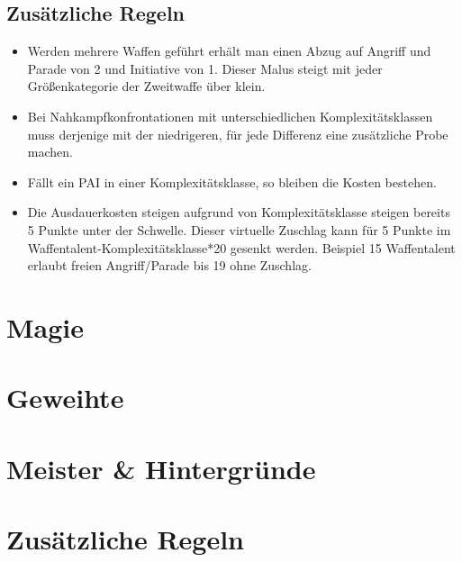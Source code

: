 \documentclass[a4paper,12pt,oneside]{book}
\begin{document}
\chapter{Zusätzliche Regeln}
\begin{itemize}
\item Werden mehrere Waffen geführt erhält man einen Abzug auf Angriff und Parade von 2 und Initiative von 1. Dieser Malus steigt mit jeder Größenkategorie der Zweitwaffe über klein.
\item Bei Nahkampfkonfrontationen mit unterschiedlichen Komplexitätsklassen muss derjenige mit der niedrigeren, für jede Differenz eine zusätzliche Probe machen.
\item Fällt ein PAI in einer Komplexitätsklasse, so bleiben die Kosten bestehen.
\item Die Ausdauerkosten steigen aufgrund von Komplexitätsklasse steigen bereits 5 Punkte unter der Schwelle. Dieser virtuelle Zuschlag kann für 5 Punkte im Waffentalent-Komplexitätsklasse*20 gesenkt werden. Beispiel 15 Waffentalent erlaubt freien Angriff/Parade bis 19 ohne Zuschlag.
\end{itemize} 


\part{Magie}
\setcounter{chapter}{0}
\part{Geweihte}
\setcounter{chapter}{0}
\part{Meister \& Hintergründe}
\setcounter{chapter}{0}
\part{Zusätzliche Regeln}
\setcounter{chapter}{0}
\end{document}
